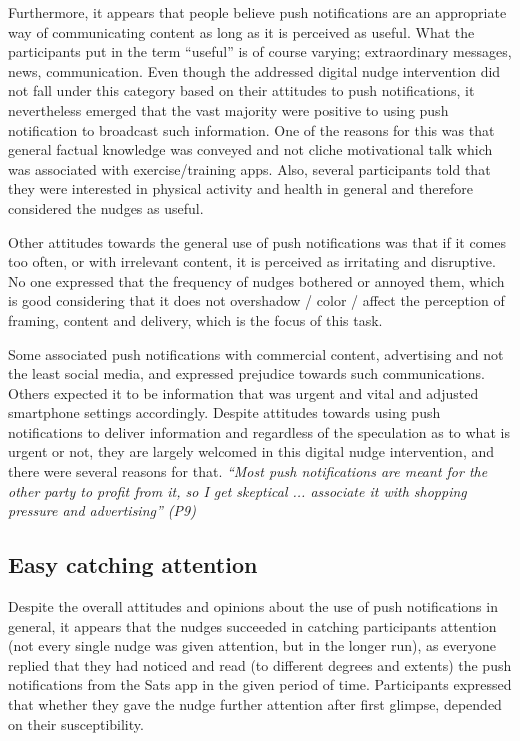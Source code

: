 Furthermore, it appears that people believe push notifications are an appropriate way of communicating content as long as it is perceived as useful. What the participants put in the term “useful” is of course varying; extraordinary messages, news, communication. Even though the addressed digital nudge intervention did not fall under this category based on their attitudes to push notifications, it nevertheless emerged that the vast majority were positive to using push notification to broadcast such information. One of the reasons for this was that general factual knowledge was conveyed and not cliche motivational talk which was associated with exercise/training apps. Also, several participants told that they were interested in physical activity and health in general and therefore considered the nudges as useful. 

Other attitudes towards the general use of push notifications was that if it comes too often, or with irrelevant content, it is perceived as irritating and disruptive. No one expressed that the frequency of nudges bothered or annoyed them, which is good considering that it does not overshadow / color / affect the perception of framing, content and delivery, which is the focus of this task.

Some associated push notifications with commercial content, advertising and not the least social media, and expressed prejudice towards such communications. Others expected it to be information that was urgent and vital and adjusted smartphone settings accordingly. Despite attitudes towards using push notifications to deliver information and regardless of the speculation as to what is urgent or not, they are largely welcomed in this digital nudge intervention, and there were several reasons for that. \textit{“Most push notifications are meant for the other party to profit from it, so I get	skeptical ... associate it with shopping pressure and advertising” (P9)}

\subsection{Easy catching attention}
Despite the overall attitudes and opinions about the use of push notifications in general, it appears that the nudges succeeded in catching participants attention (not every single nudge was given attention, but in the longer run), as everyone replied that they had noticed and read (to different degrees and extents) the push notifications from the Sats app in the given period of time. Participants expressed that whether they gave the nudge further attention after first glimpse, depended on their susceptibility. 

